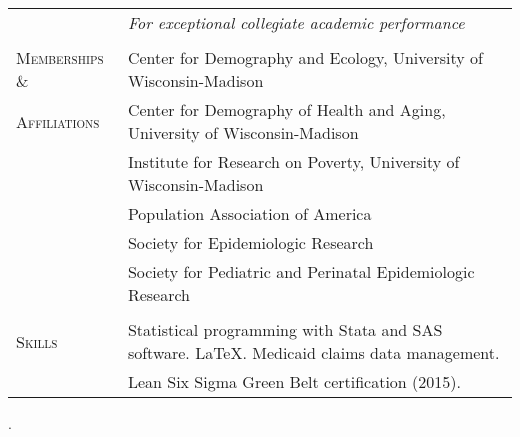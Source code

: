 \documentclass[letterpaper,10pt,oneside]{article}
\begin{document}
\begin{longtable}{@{} p{} p{}}
     & \textit{For exceptional collegiate academic performance} \\
     & \\
\textsc{Memberships \&} & Center for Demography and Ecology, University of Wisconsin-Madison \\
\textsc{Affiliations} & Center for Demography of Health and Aging, University of Wisconsin-Madison \\
     & Institute for Research on Poverty, University of Wisconsin-Madison \\
     & Population Association of America \\
     & Society for Epidemiologic Research \\
     & Society for Pediatric and Perinatal Epidemiologic Research \\
     & \\
\textsc{Skills} & Statistical programming with Stata and SAS software. \LaTeX. Medicaid claims data management. \\
     & Lean Six Sigma Green Belt certification (2015).\\
\end{longtable}. 
\end{document}
